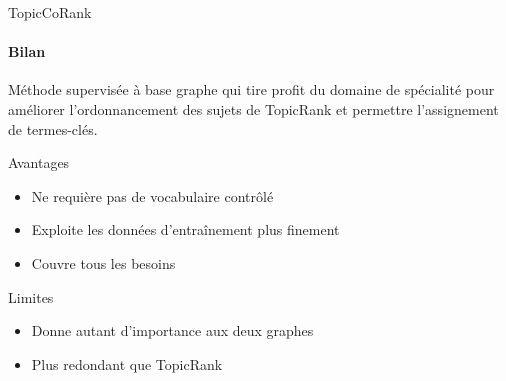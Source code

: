 \begin{frame}{TopicCoRank}\framesubtitle{Bilan}
  Méthode supervisée à base graphe qui tire profit du domaine de spécialité pour
  améliorer l'ordonnancement des sujets de TopicRank et permettre l'assignement
  de termes-clés.

  \vspace{1em}

  \begin{block}{Avantages}
    \begin{itemize}
      \item{Ne requière pas de vocabulaire contrôlé}
      \item{Exploite les données d'entraînement plus finement}
      \item{Couvre tous les besoins}
    \end{itemize}
  \end{block}

  \vspace{1em}

  \begin{alertblock}{Limites}
    \begin{itemize}
      \item{Donne autant d'importance aux deux graphes}
      \item{Plus redondant que TopicRank}
    \end{itemize}
  \end{alertblock}
\end{frame}

